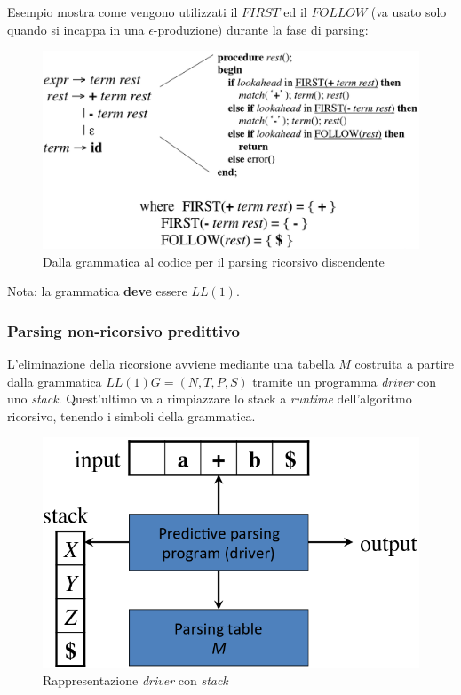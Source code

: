 Esempio mostra come vengono utilizzati il $FIRST$ ed il $FOLLOW$ (va usato solo
quando si incappa in una $\epsilon$-produzione) durante la
fase di parsing:
\begin{figure}[H]
\begin{center}
\includegraphics[scale=0.4]{res/image/example_RDP}
\end{center}
\caption{Dalla grammatica al codice per il parsing ricorsivo discendente}
\label{img:example_RDP}
\end{figure}

Nota: la grammatica \textbf{deve} essere $LL(1)$.

\subsubsection{Parsing non-ricorsivo predittivo}
L'eliminazione della ricorsione avviene mediante una tabella $M$ costruita a
partire dalla grammatica $LL(1) G=(N,T,P,S)$ tramite un programma
\textit{driver} con uno \textit{stack}. Quest'ultimo va a rimpiazzare lo stack
a \textit{runtime} dell'algoritmo ricorsivo, tenendo i simboli della grammatica.

\begin{figure}[H]
\begin{center}
\includegraphics[scale=0.5]{res/image/driver_stack}
\end{center}
\caption{Rappresentazione \textit{driver} con \textit{stack}}
\label{img:driver_stack}
\end{figure}

